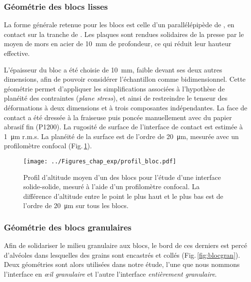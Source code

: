 \subsubsection{Géométrie des blocs lisses}

La forme générale retenue pour les blocs est celle d'un parallélépipède de , en contact sur la tranche de . Les plaques sont rendues solidaires de la presse par le moyen de mors en acier de \SI{10}{\mm} de profondeur, ce qui réduit leur hauteur effective.

L'épaisseur du bloc a été choisie de \SI{10}{\mm}, faible devant ses deux autres dimensions, afin de pouvoir considérer l'échantillon comme bidimensionnel. Cette géométrie permet d'appliquer les simplifications associées à l'hypothèse de planéité des contraintes (\textit{plane stress}), et ainsi de restreindre le tenseur des déformations à deux dimensions et à trois composantes indépendantes. La face de contact a été dressée à la fraiseuse puis poncée manuellement avec du papier abrasif fin (P1200). La rugosité de surface de l'interface de contact est estimée à \SI{1}{\micro\meter} r.m.s. La planéité de la surface est de l'ordre de \SI{20}{\micro\meter}, mesurée avec un profilomètre confocal (Fig.\,\ref{fig:profilobloc}).


\begin{figure}[h]
\centering	
\texttt{[image: ../Figures\_chap\_exp/profil\_bloc.pdf]}
\caption[Profil moyen d'un bloc de PMMA]{Profil d'altitude moyen d'un des blocs pour l'étude d'une interface solide-solide, mesuré à l'aide d'un profilomètre confocal. La différence d'altitude entre le point le plus haut et le plus bas est de l'ordre de \SI{20}{\micro\meter} sur tous les blocs.}
\label{fig:profilobloc}
\end{figure}


\subsubsection{Géométrie des blocs granulaires}

\label{sec:geometriedesblocs}

Afin de solidariser le milieu granulaire aux blocs, le bord de ces derniers est percé d'alvéoles dans lesquelles des grains sont encastrés et collés (Fig.\,\ref{fig:blocgran}). Deux géométries sont alors utilisées dans notre étude, l'une que nous nommons l'interface en \textit{œil granulaire} et l'autre l'interface  \textit{entièrement granulaire}.


